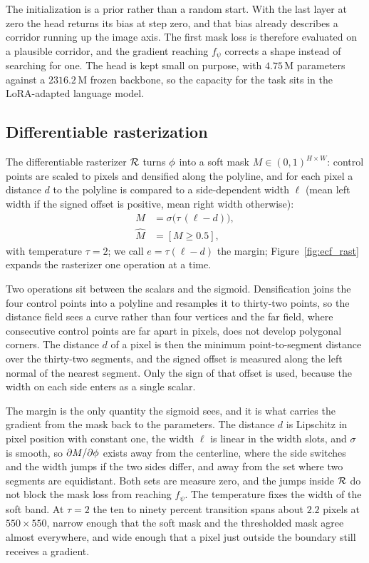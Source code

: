 The initialization is a prior rather than a random start. With the last layer at zero the head returns its bias at step zero, and that bias already describes a corridor running up the image axis. The first mask loss is therefore evaluated on a plausible corridor, and the gradient reaching $f_\psi$ corrects a shape instead of searching for one. The head is kept small on purpose, with $4.75$\,M parameters against a $2316.2$\,M frozen backbone, so the capacity for the task sits in the LoRA-adapted language model.

\subsection{Differentiable rasterization}
\label{sec:rast}

The differentiable rasterizer $\mathcal{R}$ turns $\phi$ into a soft mask $M \in (0,1)^{H \times W}$: control points are scaled to pixels and densified along the polyline, and for each pixel a distance $d$ to the polyline is compared to a side-dependent width $\ell$ (mean left width if the signed offset is positive, mean right width otherwise):
\begin{equation}
\begin{aligned}
M &= \sigma\!\big(\tau\,(\ell - d)\big), \\
\hat{M} &= [M \ge 0.5],
\end{aligned}
\label{eq:rast}
\end{equation}
with temperature $\tau{=}2$; we call $e{=}\tau(\ell-d)$ the margin; Figure~\ref{fig:ecf_rast} expands the rasterizer one operation at a time.

Two operations sit between the scalars and the sigmoid. Densification joins the four control points into a polyline and resamples it to thirty-two points, so the distance field sees a curve rather than four vertices and the far field, where consecutive control points are far apart in pixels, does not develop polygonal corners. The distance $d$ of a pixel is then the minimum point-to-segment distance over the thirty-two segments, and the signed offset is measured along the left normal of the nearest segment. Only the sign of that offset is used, because the width on each side enters as a single scalar.

The margin is the only quantity the sigmoid sees, and it is what carries the gradient from the mask back to the parameters. The distance $d$ is Lipschitz in pixel position with constant one, the width $\ell$ is linear in the width slots, and $\sigma$ is smooth, so $\partial M/\partial \phi$ exists away from the centerline, where the side switches and the width jumps if the two sides differ, and away from the set where two segments are equidistant. Both sets are measure zero, and the jumps inside $\mathcal{R}$ do not block the mask loss from reaching $f_\psi$. The temperature fixes the width of the soft band. At $\tau{=}2$ the ten to ninety percent transition spans about $2.2$ pixels at $550{\times}550$, narrow enough that the soft mask and the thresholded mask agree almost everywhere, and wide enough that a pixel just outside the boundary still receives a gradient.

